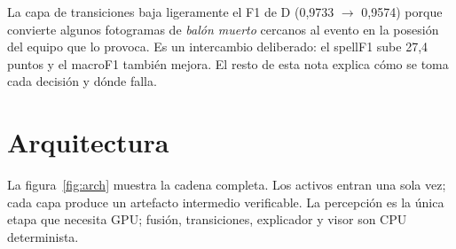 \documentclass[10pt,a4paper]{article}
\begin{document}
La capa de transiciones baja ligeramente el F1 de D (0,9733 $\to$ 0,9574) porque convierte algunos
fotogramas de \emph{balón muerto} cercanos al evento en la posesión del equipo que lo provoca. Es
un intercambio deliberado: el spellF1 sube 27,4 puntos y el macroF1 también mejora. El resto de
esta nota explica cómo se toma cada decisión y dónde falla.

\section{Arquitectura}

La figura~\ref{fig:arch} muestra la cadena completa. Los activos entran una sola vez; cada capa
produce un artefacto intermedio verificable. La percepción es la única etapa que necesita GPU;
fusión, transiciones, explicador y visor son CPU determinista.
\end{document}
